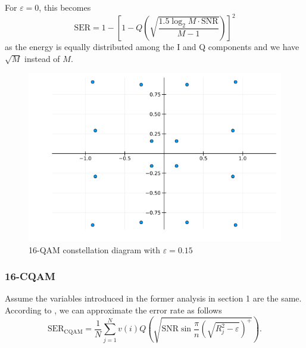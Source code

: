 \documentclass[11pt,a4paper,onecolumn,final]{article}
\newcommand{\eps}{\varepsilon}
\begin{document}
For \(\eps = 0\), this becomes
\begin{equation}
    \text{SER} = 1 - \left[1 - Q\left(\sqrt{\frac{1.5\log_2 M \cdot \text{SNR}}{M - 1}}\right)\right]^2
\end{equation}
as the energy is equally distributed among the I and Q components and we have \(\sqrt{M}\) instead of \(M\). 
\begin{figure}[h]
    \centering
    \includegraphics[scale=0.6]{16qam_e015.png}
    \caption{16-QAM constellation diagram with \(\eps = 0.15\)}
\end{figure}

\subsubsection*{16-CQAM}
Assume the variables introduced in the former analysis in section 1 are the same. According to \cite{cqam}, we can approximate the error rate as follows
\begin{equation}
    \text{SER}_\text{CQAM} = \frac{1}{N} \sum_{j = 1}^{N }v(i)Q\left(\sqrt{\text{SNR} \sin \frac{\pi}{n}\left(\sqrt{R_j^2 - \eps }\right)^+}\right). 
\end{equation}
\end{document}
